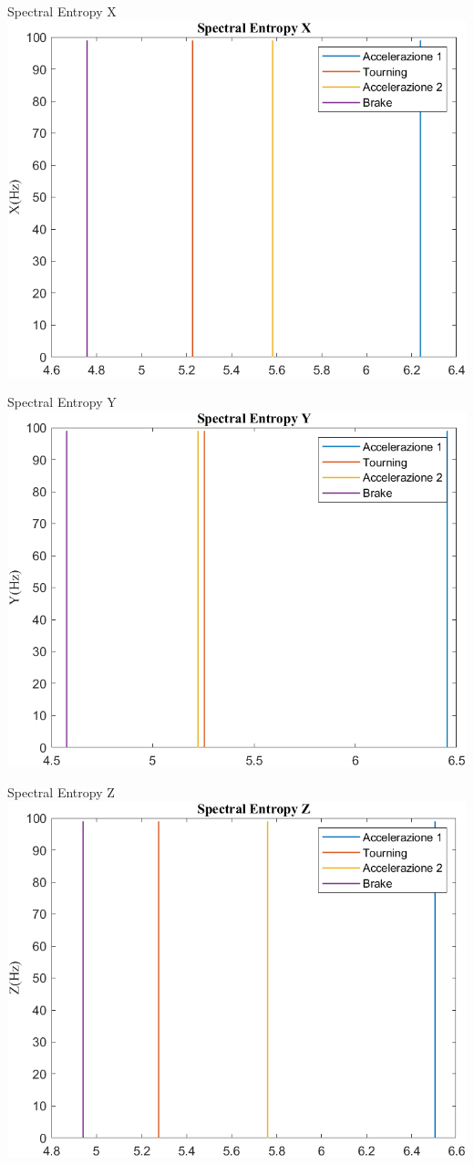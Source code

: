 \documentclass[beamer]{standalone}
\begin{document}
	\begin{frame}{{Spectral Entropy X}}
		\centering\includegraphics[height=.8\textheight]{figure/Acc/Trasformata/Spectral EntropyX}
	\end{frame}
	
	\begin{frame}{{Spectral Entropy Y}}
		\centering\includegraphics[height=.8\textheight]{figure/Acc/Trasformata/Spectral EntropyY}
	\end{frame}
	
	\begin{frame}{{Spectral Entropy Z}}
		\centering\includegraphics[height=.8\textheight]{figure/Acc/Trasformata/Spectral EntropyZ}
	\end{frame}
	
\end{document}
